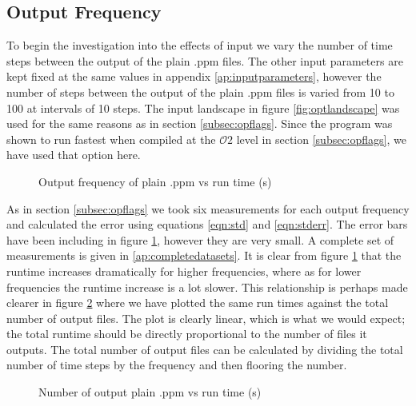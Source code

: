 \subsection{Output Frequency}
\label{subsec:outfreq}
To begin the investigation into the effects of input we vary the number of time steps between the output of the plain .ppm files. The other input parameters are kept fixed at the same values in appendix \ref{ap:inputparameters}, however the number of steps between the output of the plain .ppm files is varied from 10 to 100 at intervals of 10 steps. The input landscape in figure \ref{fig:optlandscape} was used for the same reasons as in section \ref{subsec:opflags}. Since the program was shown to run fastest when compiled at the $\mathcal{O}2$ level in section \ref{subsec:opflags}, we have used that option here. 
\begin{figure}
\centering
{}
\caption{Output frequency of plain .ppm vs run time (s)}
\label{fig:outfreqgraph}
\end{figure}

As in section \ref{subsec:opflags} we took six measurements for each output frequency and calculated the error using equations \ref{eqn:std} and \ref{eqn:stderr}. The error bars have been including in figure \ref{fig:outfreqgraph}, however they are very small. A complete set of measurements is given in \ref{ap:completedatasets}. It is clear from figure \ref{fig:outfreqgraph} that the runtime increases dramatically for higher frequencies, where as for lower frequencies the runtime increase is a lot slower. This relationship is perhaps made clearer in figure \ref{fig:outnumbgraph} where we have plotted the same run times against the total number of output files. The plot is clearly linear, which is what we would expect; the total runtime should be directly proportional to the number of files it outputs. The total number of output files can be calculated by dividing the total number of time steps by the frequency and then flooring the number.

\begin{figure}
\centering
{}
\caption{Number of output plain .ppm vs run time (s)}
\label{fig:outnumbgraph}
\end{figure}

